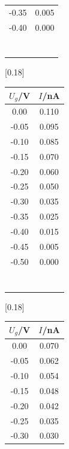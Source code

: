 \begin{table}
{\begin{tabular}{c c}
      -0.35 & 0.005 \\
      -0.40 & 0.000 \\
      \\
      \\
      \\
      \\
      \\
      \\
      \\
      \bottomrule
    \end{tabular}
    }
  [0.18\textwidth]{
      \begin{tabular}{c c}
        \toprule
        $U_g$/\si{\volt} & $I$/\si{\nano\ampere}\\
        \midrule
        0.00 & 0.110 \\
        -0.05 & 0.095 \\
        -0.10 & 0.085 \\
        -0.15 & 0.070 \\
        -0.20 & 0.060 \\
        -0.25 & 0.050 \\
        -0.30 & 0.035 \\
        -0.35 & 0.025 \\
        -0.40 & 0.015 \\
        -0.45 & 0.005 \\
        -0.50 & 0.000 \\
        \\
        \\
        \\
        \\
        \\
        \\
        \\
        \bottomrule
      \end{tabular}
      }
    [0.18\textwidth]{
      \begin{tabular}{c c}
        \toprule
        $U_g$/\si{\volt} & $I$/\si{\nano\ampere}\\
        \midrule
        0.00 & 0.070 \\
        -0.05 & 0.062 \\
        -0.10 & 0.054 \\
        -0.15 & 0.048 \\
        -0.20 & 0.042 \\
        -0.25 & 0.035 \\
        -0.30 & 0.030 \\

\end{tabular}}
\end{table}
